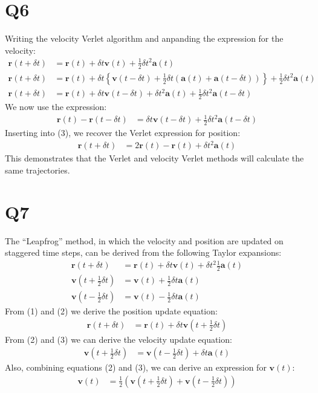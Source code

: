 \documentclass[a4paper,11pt]{article}
\numberwithin{equation}{section}
\newcommand{\bv}[1]{\mathbf{#1}}
\begin{document}
\section{Q6}
Writing the velocity Verlet algorithm and anpanding the expression for the velocity:
\begin{align}
 \bv{r}(t+\delta t) &= \bv{r}(t)+\delta t \bv{v}(t)+\frac{1}{2}\delta t^2 \bv{a}(t)\\
 \bv{r}(t+\delta t) &= \bv{r}(t)+\delta t \left\{\bv{v}(t-\delta t)+\frac{1}{2}\delta t\left(\bv{a}(t)+\bv{a}(t-\delta t) \right) \right\}+\frac{1}{2}\delta t^2 \bv{a}(t)\\
 \bv{r}(t+\delta t) &= \bv{r}(t)+\delta t \bv{v}(t-\delta t)+\delta t^2\bv{a}(t)+\frac{1}{2}\delta t^2\bv{a}(t-\delta t)
\end{align}
We now use the expression:
\begin{align}
 \bv{r}(t)-\bv{r}(t-\delta t) &= \delta t\bv{v}(t-\delta t)+\frac{1}{2}\delta t^2\bv{a}(t-\delta t)
\end{align}
Inserting into (3), we recover the Verlet expression for position:
\begin{align}
 \bv{r}(t+\delta t) &= 2\bv{r}(t)-\bv{r}(t)+\delta t^2\bv{a}(t)
\end{align}
This demonstrates that the Verlet and velocity Verlet methods will calculate the same trajectories.
\\
\section{Q7}
The ``Leapfrog'' method, in which the velocity and position are updated on staggered time steps, can be derived from the following Taylor expansions:
\begin{align}
 \bv{r}(t+\delta t) &= \bv{r}(t)+\delta t\bv{v}(t)+\delta t^2\frac{1}{2}\bv{a}(t)\\
 \bv{v}(t+\frac{1}{2}\delta t) &= \bv{v}(t)+\frac{1}{2}\delta t \bv{a}(t)\\
 \bv{v}(t-\frac{1}{2}\delta t) &= \bv{v}(t)-\frac{1}{2}\delta t \bv{a}(t)
\end{align}
From (1) and (2) we derive the position update equation:
\begin{align}
 \bv{r}(t+\delta t) &= \bv{r}(t)+\delta t\bv{v}(t+\frac{1}{2}\delta t)
\end{align}
From (2) and (3) we can derive the velocity update equation:
\begin{align}
 \bv{v}(t+\frac{1}{2}\delta t) &= \bv{v}(t-\frac{1}{2}\delta t)+\delta t\bv{a}(t)
\end{align}
Also, combining equations (2) and (3), we can derive an expression for $\bv{v}(t)$:
\begin{align}
 \bv{v}(t) &= \frac{1}{2}\left(\bv{v}(t+\frac{1}{2}\delta t)+\bv{v}(t-\frac{1}{2}\delta t) \right)
\end{align}
\end{document}
